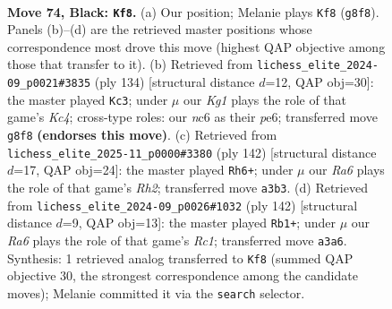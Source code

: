 \documentclass[11pt]{article}
\begin{document}
\clearpage

\begin{figure}[p]\centering
\begin{subfigure}{0.46\textwidth}\centering
\resizebox{\linewidth}{!}{%
\newchessgame
\chessboard[
  setfen={6k1/3R2p1/2N2p2/7p/3P3P/r5P1/6K1/8 b - - 42 74},
  showmover=false,
  pgfstyle=straightmove, color=movearrow, markmove={g8-f8}
]}
\caption{}
\end{subfigure}\hfill
\begin{subfigure}{0.46\textwidth}\centering
\resizebox{\linewidth}{!}{%
\newchessgame
\chessboard[
  setfen={8/R7/1r2p1k1/5p2/p1K2P2/P7/1P6/8 w - - 2 68},
  showmover=false,
  pgfstyle=straightmove, color=movearrow, markmove={c4-c3}
]}
\caption{}
\end{subfigure}
\\[4pt]
\begin{subfigure}{0.46\textwidth}\centering
\resizebox{\linewidth}{!}{%
\newchessgame
\chessboard[
  setfen={8/2p5/1p1p1k2/1P1P4/2r2P2/5K2/7R/8 w - - 0 72},
  showmover=false,
  pgfstyle=straightmove, color=movearrow, markmove={h2-h6}
]}
\caption{}
\end{subfigure}\hfill
\begin{subfigure}{0.46\textwidth}\centering
\resizebox{\linewidth}{!}{%
\newchessgame
\chessboard[
  setfen={8/5p2/6p1/1k4P1/2prPP2/8/4K3/2R5 w - - 0 72},
  showmover=false,
  pgfstyle=straightmove, color=movearrow, markmove={c1-b1}
]}
\caption{}
\end{subfigure}
\caption{\textbf{Move 74, Black: \texttt{Kf8}.} (a) Our position; Melanie plays \texttt{Kf8} (\texttt{g8f8}). Panels (b)--(d) are the retrieved master positions whose correspondence most drove this move (highest QAP objective among those that transfer to it). (b) Retrieved from \texttt{lichess\_elite\_2024-09\_p0021\#3835} (ply 134) [structural distance $d$=12, QAP obj=30]: the master played \texttt{Kc3}; under $\mu$ our \emph{Kg1} plays the role of that game's \emph{Kc4}; cross-type roles: our \emph{n}c6 as their \emph{p}e6; transferred move \texttt{g8f8} \textbf{(endorses this move)}. (c) Retrieved from \texttt{lichess\_elite\_2025-11\_p0000\#3380} (ply 142) [structural distance $d$=17, QAP obj=24]: the master played \texttt{Rh6+}; under $\mu$ our \emph{Ra6} plays the role of that game's \emph{Rh2}; transferred move \texttt{a3b3}. (d) Retrieved from \texttt{lichess\_elite\_2024-09\_p0026\#1032} (ply 142) [structural distance $d$=9, QAP obj=13]: the master played \texttt{Rb1+}; under $\mu$ our \emph{Ra6} plays the role of that game's \emph{Rc1}; transferred move \texttt{a3a6}. Synthesis: 1 retrieved analog transferred to \texttt{Kf8} (summed QAP objective 30, the strongest correspondence among the candidate moves); Melanie committed it via the \texttt{search} selector.}
\label{fig:thought-m147}
\end{figure}
\end{document}
